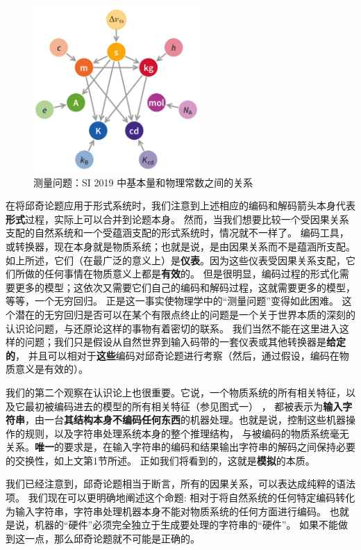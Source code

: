 \documentclass[a4paper,12pt]{article}
\begin{document}
\begin{figure}[ht]
\centering
\includegraphics[height=2.5in]{images/unit_relations_SI.png}
\caption{测量问题：SI 2019 中基本量和物理常数之间的关系}
\end{figure}

在将\gls{邱奇论题}应用于\gls{形式系统}时，我们注意到上述相应的\gls{编码}和\gls{解码}箭头本身代表\textbf{形式}过程，实际上可以合并到论题本身。
然而，当我们想要比较一个受\gls{因果关系}支配的自然系统和一个受\gls{蕴涵}支配的\gls{形式系统}时，情况就不一样了。
\gls{编码工具}，或\gls{转换器}，现在本身就是\gls{物质系统}；也就是说，是由\gls{因果关系}而不是\gls{蕴涵}所支配。
如上所述，它们（在最广泛的意义上）是\textbf{仪表}。因为这些仪表受\gls{因果关系}支配，它们所做的任何事情在\gls{物质}意义上都是\textbf{有效}的。
但是很明显，\gls{编码过程}的\gls{形式化}需要更多的\gls{模型}；这依次又需要它们自己的\gls{编码}和\gls{解码过程}，这就需要更多的\gls{模型}，等等，一个无穷回归。
正是这一事实使物理学中的“\gls{测量问题}”变得如此困难。
这个潜在的无穷回归是否可以在某个有限点终止的问题是一个关于世界本质的深刻的认识论问题，与还原论这样的事物有着密切的联系。
我们当然不能在这里进入这样的问题；我们只是假设从自然世界到输入码带的一套仪表或其他\gls{转换器}是\textbf{给定的}，
并且可以相对于\textbf{这些}\gls{编码}对\gls{邱奇论题}进行考察（然后，通过假设，\gls{编码}在\gls{物质}意义是有效的）。

我们的第二个观察在认识论上也很重要。它说，一个\gls{物质系统}的所有相关特征，以及它最初被\gls{编码}进去的\gls{模型}的所有相关特征（参见图式一） ，
都被表示为\textbf{输入字符串}，由一台\textbf{其结构本身不\gls{编码}任何东西}的机器处理。也就是说，控制这些机器操作的规则，以及\gls{字符串处理}系统本身的整个\gls{推理结构}，
与被\gls{编码}的\gls{物质系统}毫无关系。\textbf{唯一}的要求是，在输入字符串的\gls{编码}和结果输出字符串的\gls{解码}之间保持必要的交换性，如上文第1节所述。
正如我们将看到的，这就是\textbf{\gls{模拟}}的本质。

我们已经注意到，\gls{邱奇论题}相当于断言，所有的\gls{因果关系}，可以表达成纯粹的\gls{语法项}。
我们现在可以更明确地阐述这个\gls{命题}: 相对于将自然系统的任何特定\gls{编码}转化为输入字符串，\gls{字符串处理}机器本身不能对\gls{物质系统}的任何方面进行\gls{编码}。
也就是说，机器的“\gls{硬件}”必须完全独立于\gls{生成}要处理的字符串的“\gls{硬件}”。 如果不能做到这一点，那么\gls{邱奇论题}就不可能是正确的。
\end{document}
